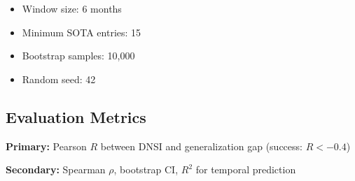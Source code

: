 \begin{itemize}
    \item Window size: 6 months
    \item Minimum SOTA entries: 15
    \item Bootstrap samples: 10,000
    \item Random seed: 42
\end{itemize}

\subsection{Evaluation Metrics}

\textbf{Primary:} Pearson $R$ between DNSI and generalization gap (success: $R < -0.4$)

\textbf{Secondary:} Spearman $\rho$, bootstrap CI, $R^2$ for temporal prediction
